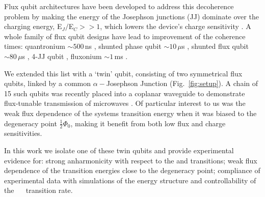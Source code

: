 Flux qubit architectures have been developed to address this decoherence problem by making the
energy of the  Josephson junctions (JJ) dominate  over the charging energy,  E$_J/$E$_C >> 1$,
which  lowers   the  device's   charge  sensitivity   \cite{orlando1999}  \cite{chiorescu2003}
\cite{mooij1999}.   A whole  family of  flux qubit  designs have  lead to  improvement of  the
coherence times:  quantronium $\sim500\,$ns \cite{cottet2002} \cite{gu2017},  shunted phase qubit
$\sim10\,\mu  $s \cite{stern2014}  ,  shunted  flux qubit  $\sim80\,\mu$s  \cite{yan2016}  , 4-JJ  qubit
\cite{qui2016}, fluxonium $\sim1\,$ms \cite{pop2014}.
 
We extended this list  with a `twin' qubit, consisting of two  symmetrical flux qubits, linked
by a  common $ \alpha-$Josephson  Junction (Fig.~\ref{fig:setup}).  A chain  of 15 such  qubits was
recently  placed  into  a  coplanar  waveguide to  demonstrate  flux-tunable  transmission  of
microwaves \cite{shulga2018}.   Of particular interest to  us was the weak  flux dependence of
the systems transition  energy when it was  biased to the degeneracy  point $\frac{1}{2}\Phi_0 $,
making it benefit from both low flux and charge sensitivities.
 
In this work we isolate one of these twin qubits and provide experimental evidence for: strong
anharmonicity with respect to the \ilra{} and \ilra{} transitions;
weak flux dependence of  the transition energies close to the  degeneracy point; compliance of
experimental  data  with simulations  of  the  energy  structure  and controllability  of  the
~\ilra~ transition rate.

